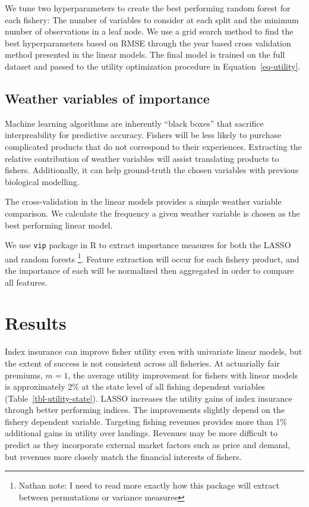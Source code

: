 \documentclass[
  letterpaper,
  DIV=11,
  numbers=noendperiod]{scrartcl}
\begin{document}
We tune two hyperparameters to create the best performing random forest
for each fishery: The number of variables to consider at each split and
the minimum number of observations in a leaf node. We use a grid search
method to find the best hyperparameters based on RMSE through the year
based cross validation method presented in the linear models. The final
model is trained on the full dataset and passed to the utility
optimization procedure in Equation~\ref{eq-utility}.

\hypertarget{weather-variables-of-importance}{%
\subsection{Weather variables of
importance}\label{weather-variables-of-importance}}

Machine learning algorithms are inherently ``black boxes'' that
sacrifice interpreability for predictive accuracy. Fishers will be less
likely to purchase complicated products that do not correspond to their
experiences. Extracting the relative contribution of weather variables
will assist translating products to fishers. Additionally, it can help
ground-truth the chosen variables with previous biological modelling.

The cross-validation in the linear models provides a simple weather
variable comparison. We calculate the frequency a given weather variable
is chosen as the best performing linear model.

We use \texttt{vip} package in R to extract importance measures for both
the LASSO and random forests \footnote{Nathan note: I need to read more
  exactly how this package will extract between permutations or variance
  measures}. Feature extraction will occur for each fishery product, and
the importance of each will be normalized then aggregated in order to
compare all features.

\hypertarget{sec-results}{%
\section{Results}\label{sec-results}}

Index insurance can improve fisher utility even with univariate linear
models, but the extent of success is not consistent across all
fisheries. At actuarially fair premiums, \(m=1\), the average utility
improvement for fishers with linear models is approximately 2\% at the
state level of all fishing dependent variables
(Table~\ref{tbl-utility-state}). LASSO increases the utility gains of
index insurance through better performing indices. The improvements
slightly depend on the fishery dependent variable. Targeting fishing
revenues provides more than 1\% additional gains in utility over
landings. Revenues may be more difficult to predict as they incorporate
external market factors such as price and demand, but revenues more
closely match the financial interests of fishers.
\end{document}
